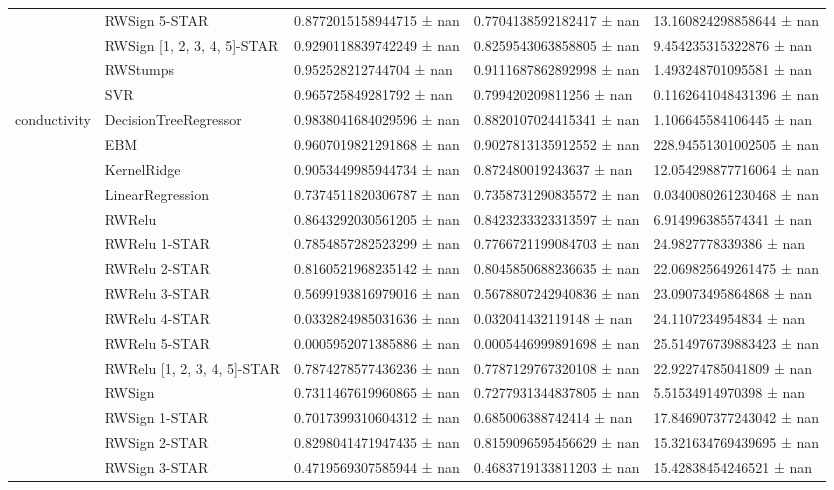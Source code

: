 \begin{tabular}{lllll}
 & RWSign 5-STAR & 0.8772015158944715 ± nan & 0.7704138592182417 ± nan & 13.160824298858644 ± nan \\
 & RWSign [1, 2, 3, 4, 5]-STAR & 0.9290118839742249 ± nan & 0.8259543063858805 ± nan & 9.454235315322876 ± nan \\
 & RWStumps & 0.952528212744704 ± nan & 0.9111687862892998 ± nan & 1.493248701095581 ± nan \\
 & SVR & 0.965725849281792 ± nan & 0.799420209811256 ± nan & 0.1162641048431396 ± nan \\
\cline{1-5}
\multirow[t]{20}{*}{conductivity} & DecisionTreeRegressor & 0.9838041684029596 ± nan & 0.8820107024415341 ± nan & 1.106645584106445 ± nan \\
 & EBM & 0.9607019821291868 ± nan & 0.9027813135912552 ± nan & 228.94551301002505 ± nan \\
 & KernelRidge & 0.9053449985944734 ± nan & 0.872480019243637 ± nan & 12.054298877716064 ± nan \\
 & LinearRegression & 0.7374511820306787 ± nan & 0.7358731290835572 ± nan & 0.0340080261230468 ± nan \\
 & RWRelu & 0.8643292030561205 ± nan & 0.8423233323313597 ± nan & 6.914996385574341 ± nan \\
 & RWRelu 1-STAR & 0.7854857282523299 ± nan & 0.7766721199084703 ± nan & 24.9827778339386 ± nan \\
 & RWRelu 2-STAR & 0.8160521968235142 ± nan & 0.8045850688236635 ± nan & 22.069825649261475 ± nan \\
 & RWRelu 3-STAR & 0.5699193816979016 ± nan & 0.5678807242940836 ± nan & 23.09073495864868 ± nan \\
 & RWRelu 4-STAR & 0.0332824985031636 ± nan & 0.032041432119148 ± nan & 24.1107234954834 ± nan \\
 & RWRelu 5-STAR & 0.0005952071385886 ± nan & 0.0005446999891698 ± nan & 25.514976739883423 ± nan \\
 & RWRelu [1, 2, 3, 4, 5]-STAR & 0.7874278577436236 ± nan & 0.7787129767320108 ± nan & 22.92274785041809 ± nan \\
 & RWSign & 0.7311467619960865 ± nan & 0.7277931344837805 ± nan & 5.51534914970398 ± nan \\
 & RWSign 1-STAR & 0.7017399310604312 ± nan & 0.685006388742414 ± nan & 17.846907377243042 ± nan \\
 & RWSign 2-STAR & 0.8298041471947435 ± nan & 0.8159096595456629 ± nan & 15.321634769439695 ± nan \\
 & RWSign 3-STAR & 0.4719569307585944 ± nan & 0.4683719133811203 ± nan & 15.42838454246521 ± nan \\

\end{tabular}
